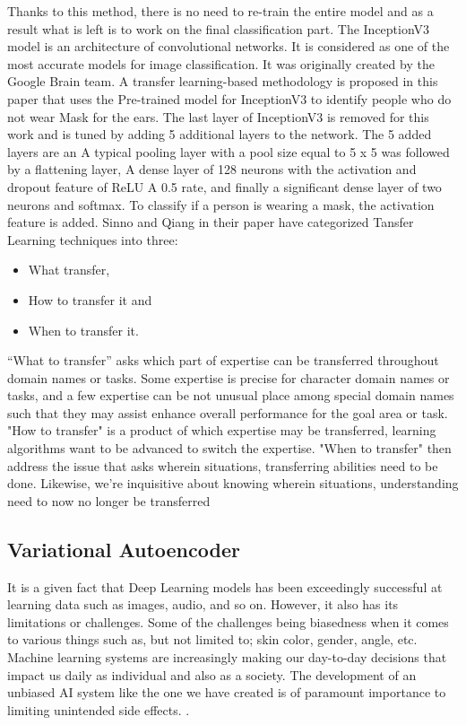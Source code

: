 Thanks to this method, there is no need to re-train the entire model and as a result what is left is to work on the final classification part.
The InceptionV3 model is an architecture of convolutional networks. It is considered as one of the most accurate models for image classification. It was originally created by the Google Brain team.\cite{hussain2018study}
A transfer learning-based methodology is proposed in this paper that uses the
Pre-trained model for InceptionV3 to identify people who do not wear
Mask for the ears. The last layer of InceptionV3 is removed for this work and is tuned by adding 5 additional layers to the network. 
The 5 added layers are an
A typical pooling layer with a pool size equal to 5 x 5 was followed by a flattening layer,
A dense layer of 128 neurons with the activation and dropout feature of ReLU
A 0.5 rate, and finally a significant dense layer of two neurons and softmax. To classify if a person is wearing a mask, the activation feature is added. Sinno and Qiang \cite{pan2009survey}
in their paper have categorized Tansfer Learning techniques into three:
\begin{itemize}
    \item What transfer,
    \item How to transfer it and
    \item When to transfer it.
\end{itemize}

“What to transfer” asks which part of expertise can
be transferred throughout domain names or tasks. Some expertise is
precise for character domain names or tasks, and a few expertise
can be not unusual place among special domain names such that they may
assist enhance overall performance for the goal area or task. "How to transfer" is a product of which expertise may be transferred, learning
algorithms want to be advanced to switch the expertise. "When to transfer" then address the issue that asks wherein situations, transferring
abilities need to be done. Likewise, we're inquisitive about knowing
wherein situations, understanding need to now no longer be transferred


\subsection{Variational Autoencoder}

 It is a given fact that Deep Learning models has been exceedingly successful at learning data such as images, audio, and so on. However, it also has its limitations
 or challenges. Some of the challenges being biasedness when it comes to various things such as, but not limited to; skin color, gender, angle, etc. 
 Machine learning systems are increasingly making our day-to-day decisions that impact us daily as individual and also as a society. The development of an unbiased AI system
 like the one we have created is of paramount importance to limiting unintended side effects. \cite{amini2019uncovering} \vspace{5mm}.
 
